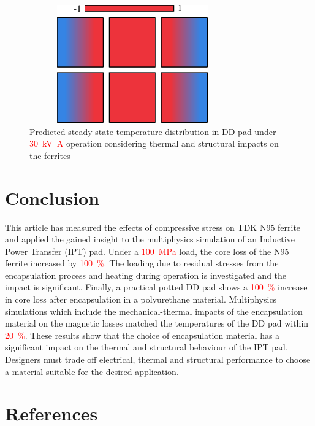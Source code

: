 \documentclass[conference]{IEEEtran}
\begin{document}
\lipsum[2]

\begin{figure}[t]
  \includegraphics[width=3.5in, height=2in]{figures/simulatedpottingpadstresses.pdf}
  \caption{Predicted steady-state temperature distribution in DD pad under \textcolor{red}{\SI{30}{\kilo\volt\ampere}} operation considering thermal and structural impacts on the ferrites}
  \label{fig:temperaturecomparison}
\end{figure}

\section{Conclusion}

This article has measured the effects of compressive stress on TDK N95 ferrite and applied the gained insight to the multiphysics simulation of an Inductive Power Transfer (IPT) pad. 
Under a \textcolor{red}{\SI{100}{\mega\pascal}} load, the core loss of the N95 ferrite increased by \textcolor{red}{\SI{100}{\percent}}. 
The loading due to residual stresses from the encapsulation process and heating during operation is investigated and the impact is significant. 
Finally, a practical potted DD pad shows a \textcolor{red}{\SI{100}{\percent}} increase in core loss after encapsulation in a polyurethane material. 
Multiphysics simulations which include the mechanical-thermal impacts of the encapsulation material on the magnetic losses matched the temperatures of the DD pad within \textcolor{red}{\SI{20}{\percent}}. 
These results show that the choice of encapsulation material has a significant impact on the thermal and structural behaviour of the IPT pad. 
Designers must trade off electrical, thermal and structural performance to choose a material suitable for the desired application.

\section*{References}
\printbibliography[heading=none]
\end{document}
